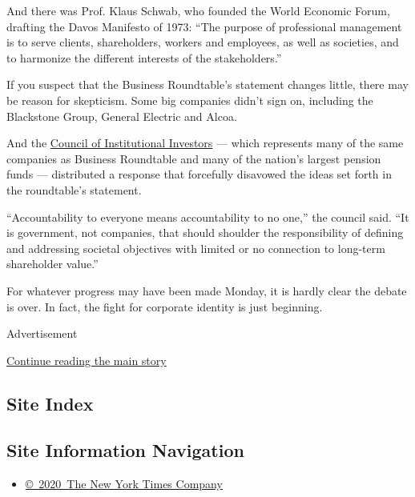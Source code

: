 And there was Prof. Klaus Schwab, who founded the World Economic Forum,
drafting the Davos Manifesto of 1973: ``The purpose of professional
management is to serve clients, shareholders, workers and employees, as
well as societies, and to harmonize the different interests of the
stakeholders.''

If you suspect that the Business Roundtable's statement changes little,
there may be reason for skepticism. Some big companies didn't sign on,
including the Blackstone Group, General Electric and Alcoa.

And the \href{https://www.cii.org/aug19_brt_response}{Council of
Institutional Investors} --- which represents many of the same companies
as Business Roundtable and many of the nation's largest pension funds
--- distributed a response that forcefully disavowed the ideas set forth
in the roundtable's statement.

``Accountability to everyone means accountability to no one,'' the
council said. ``It is government, not companies, that should shoulder
the responsibility of defining and addressing societal objectives with
limited or no connection to long-term shareholder value.''

For whatever progress may have been made Monday, it is hardly clear the
debate is over. In fact, the fight for corporate identity is just
beginning.

Advertisement

\protect\hyperlink{after-bottom}{Continue reading the main story}

\hypertarget{site-index}{%
\subsection{Site Index}\label{site-index}}

\hypertarget{site-information-navigation}{%
\subsection{Site Information
Navigation}\label{site-information-navigation}}

\begin{itemize}
\tightlist
\item
  \href{https://help.nytimes3xbfgragh.onion/hc/en-us/articles/115014792127-Copyright-notice}{©~2020~The
  New York Times Company}
\end{itemize}

